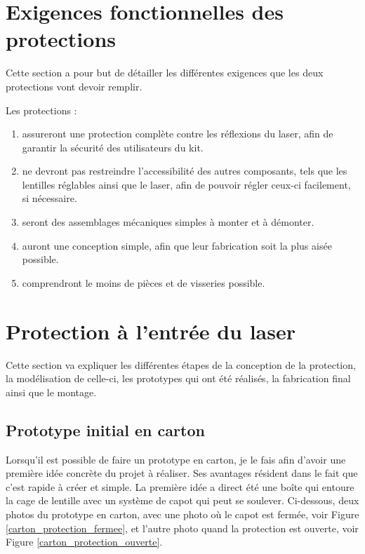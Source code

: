 \section{Exigences fonctionnelles des protections}
Cette section a pour but de détailler les différentes exigences que les deux protections vont devoir remplir.

Les protections :
\begin{enumerate}
    \item assureront une protection complète contre les réflexions du laser, afin de garantir la sécurité des utilisateurs du kit.
    \item ne devront pas restreindre l'accessibilité des autres composants, tels que les lentilles réglables ainsi que le laser, afin de pouvoir régler ceux-ci facilement, si nécessaire.
    \item seront des assemblages mécaniques simples à monter et à démonter.
    \item auront une conception simple, afin que leur fabrication soit la plus aisée possible.
    \item comprendront le moins de pièces et de visseries possible.
\end{enumerate}

\section{Protection à l'entrée du laser}
Cette section va expliquer les différentes étapes de la conception de la protection, la modélisation de celle-ci, les prototypes qui ont été réalisés, la fabrication final ainsi que le montage.
\subsection{Prototype initial en carton}
Lorsqu'il est possible de faire un prototype en carton, je le fais afin d'avoir une première idée concrète du projet à réaliser. Ses avantages résident dans le fait que c'est rapide à créer et simple. La première idée a direct été une boîte qui entoure la cage de lentille avec un système de capot qui peut se soulever. Ci-dessous, deux photos du prototype en carton, avec une photo où le capot est fermée, voir Figure \ref{carton_protection_fermee}, et l'autre photo quand la protection est ouverte, voir Figure \ref{carton_protection_ouverte}.

